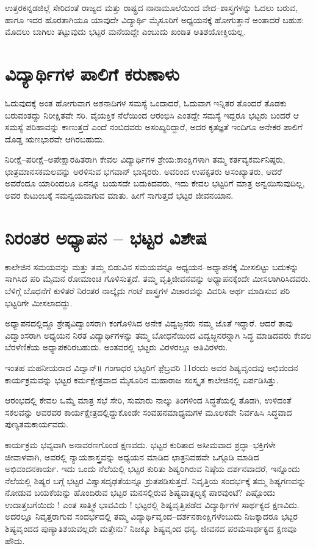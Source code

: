 ಉತ್ತರಕನ್ನಡಜಿಲ್ಲೆ ಸೇರಿದಂತೆ ರಾಜ್ಯದ ಮತ್ತು ರಾಷ್ಟ್ರದ ನಾನಾಮೂಲೆಯಿಂದ ವೇದ–ಶಾಸ್ತ್ರಗಳನ್ನು ಓದಲು ಬರುವ, ಹಾಗೂ ಇದರ ಹೊರತಾಗಿಯೂ ಯಾವುದೇ ವಿದ್ಯಾರ್ಥಿ ಮೈಸೂರಿಗೆ ಅಧ್ಯಯನಕ್ಕೆ ಹೋಗುತ್ತಾನೆ ಅಂತಾದರೆ ಬಹುಶ: ಮೊದಲು ಬಾಗಿಲು ತಟ್ಟುವುದು  ಭಟ್ಟರ ಮನೆಯದ್ದೇ ಎಂಬುದು ಖಂಡಿತ ಅತಿಶಯೋಕ್ತಿಯಲ್ಲ. 

\section*{ವಿದ್ಯಾರ್ಥಿಗಳ ಪಾಲಿಗೆ ಕರುಣಾಳು}

ಓದುವುದಕ್ಕೆ ಅಂತ ಹೋಗುವಾಗ ಅಶನಾದಿಗಳ ಸಮಸ್ಯೆ ಒಂದಾದರೆ, ಓದುವಾಗ ಇನ್ನಿತರ ತೊಂದರೆ ತೊಡಕು ಬರುವಂತದ್ದು ನಿರೀಕ್ಷಿತವೇ ಸರಿ. ವೈಯಕ್ತಿಕ ನೆಲೆಯಿಂದ ಆರಂಭಿಸಿ ಎಂತದ್ದೇ ಸಮಸ್ಯೆ ಇದ್ದರೂ ಭಟ್ಟರು ಬಂದರೆ ಆ ಸಮಸ್ಯೆ ಪರಿಹಾವನ್ನು ಕಾಣುತ್ತದೆ ಎಂದೆ ನಂಬಿದವರು ಅಸಂಖ್ಯರಿದ್ದಾರೆ, ಅದರ ಕೃತಜ್ಞತೆ ಇಂದಿಗೂ ಅನೇಕರ ಪಾಲಿಗೆ ದೊಡ್ಡ ಋಣಭಾರವೇ ಆಗಿರಬಹುದು. 

ನಿರೀಕ್ಷೆ–ಪರೀಕ್ಷೆ–ಅಪೇಕ್ಷಾರಹಿತರಾಗಿ ಕೇವಲ ವಿದ್ಯಾರ್ಥಿಗಳ ಶ್ರೇಯ:ಕಾಂಕ್ಷಿಗಳಾಗಿ ತಮ್ಮ ಕರ್ತವ್ಯಕರ್ಮನಿಷ್ಠರು, ಛಾತ್ರಮಾನಸಕಮಲವನ್ನು ಅರಳಿಸುವ ಭಗವಾನ್ ಭಾಸ್ಕರರು. ಅವರಿಂದ ಉಪಕೃತರು ಅಸಂಖ್ಯಾತರು, ಆದರೆ ಅವರೆಂದೂ ಯಾರಿಂದಲೂ ಏನನ್ನೂ ಬಯಸದೇ ಬದುಕಿದವರು, ಇದು ಕೇವಲ ಭಟ್ಟರಿಗೆ ಮಾತ್ರ ಅನ್ವಯಿಸುವುದಿಲ್ಲ, ಅವರ ಕುಟುಂಬಕ್ಕೆ ಸಮನ್ವಯವಾಗುವ ಮಾತು. ಹೀಗೆ ಸಾಗುತ್ತದೆ  ಭಟ್ಟರ ಜೀವನಯಾನ.

\section*{ನಿರಂತರ ಅಧ್ಯಾಪನ – ಭಟ್ಟರ ವಿಶೇಷ}

ಕಾಲೇಜಿನ ಸಮಯವನ್ನು ಮತ್ತು ತಮ್ಮ ಬಿಡುವಿನ ಸಮಯವನ್ನೂ ಅಧ್ಯಯನ–ಅಧ್ಯಾಪನಕ್ಕೆ ಮೀಸಲಿಟ್ಟು ಬದುಕನ್ನು ಸಾಗಿಸಿದ ಪರಿ ಮೈಮನ ರೋಮಾಂಚ ಗೊಳಿಸುತ್ತದೆ. ತಮ್ಮ ವೃತ್ತಿಜೀವನವನ್ನು ಅಧ್ಯಾಪನಕ್ಕೆಂದೇ ಮೀಸಲಾಗಿರಿಸಿದವರು. ಬೆಳಿಗ್ಗೆ ಬೊಧನೆಗೆ ಕುಳಿತರೆ ನಿರಂತರ ನಾಲ್ಕೈದು ಗಂಟೆ ಶಾಸ್ತ್ರಗಳ ವಿಚಾರವನ್ನು ವಿವರಿಸಿ ಅರ್ಥ ಮಾಡಿಸುವ ಪರಿ ಭಟ್ಟರಿಗೇ ಮೀಸಲಾದದ್ದು.

ಅಧ್ಯಾಪನದಲ್ಲಿದ್ದೂ ಶ್ರೇಷ್ಠವಿದ್ವಾಂಸರಾಗಿ  ಕಂಗೊಳಿಸಿದ ಅನೇಕ ವಿದ್ವಜ್ಜನರು ನಮ್ಮ ಜೊತೆ ಇದ್ದಾರೆ. ಆದರೆ ತಾವು ವಿದ್ವಾಂಸರಾಗಿ ಅಧ್ಯಯನ ನಿರತ ವಿದ್ಯಾರ್ಥಿಗಳನ್ನು ತಮ್ಮ ಬೋಧನೆಯಿಂದ ವಿದ್ವಜ್ಜನರನ್ನಾಗಿ ಸಿದ್ಧ ಮಾಡಿದವರು ಕೇವಲ ಬೆರಳೆಣಿಕೆಯ ಅಧ್ಯಾಪಕರಿರಬಹುದು. ಅಂತವರಲ್ಲಿ ಭಟ್ಟರು ವಿರಳರಲ್ಲೂ ಅತಿವಿರಳರು.

ಇಂತಹ ಮಹನೀಯರಾದ ವಿದ್ವಾನ್॥ ಗಂಗಾಧರ ಭಟ್ಟರಿಗೆ ಫ಼ೆಬ್ರವರಿ 11ರಂದು ಅವರ ಶಿಷ್ಯವೃಂದವು  ಅಭಿವಂದನ ಕಾರ್ಯಕ್ರಮವನ್ನು ಭಟ್ಟರ ಕರ್ಮಕ್ಷೇತ್ರವಾದ ಮೈಸೂರಿನ ಮಹಾರಾಜ ಸಂಸ್ಕೃತ ಕಾಲೇಜಿನಲ್ಲಿ ಏರ್ಪಡಿಸಿತ್ತು. 

ಆರಂಭದಲ್ಲಿ ಕೇವಲ ಒಮ್ಮೆ ಮಾತ್ರ ಸಭೆ ಸೇರಿ, ಸುಮಾರು ನಾಲ್ಕು ತಿಂಗಳಿಂದ ಸಿದ್ಧತೆಯಲ್ಲಿ ತೊಡಗಿ, ಉಳಿದಂತೆ ಸಕಲವನ್ನು ಅವರವರ ಕಾರ್ಯಕ್ಷೇತ್ರದಲ್ಲಿದ್ದುಕೊಂಡೇ ಸಂವಹನಮಾಧ್ಯಮಗಳ ಮೂಲಕವೇ ನಿರ್ವಹಿಸಿ ಸಿದ್ಧವಾದ ಪುಣ್ಯತಮಕಾರ್ಯವದು. 

ಕಾರ್ಯಕ್ರಮ ಭವ್ಯವಾಗಿ ಅನಾವರಣಗೊಂಡ ಕ್ಷಣವದು. ಭಟ್ಟರ ಕುರಿತಾದ ಅಸೀಮವಾದ ಶ್ರದ್ಧಾ–ಭಕ್ತಿಗಳೇ ಜೀವಾಳವಾಗಿ, ಅವರಲ್ಲಿ ನ್ಯಾಯಶಾಸ್ತ್ರವನ್ನು ಅಧ್ಯಯನ ಮಾಡಿದ ಛಾತ್ರನಿವಹವೇ ಒಗ್ಗೂಡಿ ಮಾಡಿದ ಅಭಿವಂದನಕಾರ್ಯ.    ಇದು ಒಂದು ನೆಲೆಯಲ್ಲಿ ಭಟ್ಟರ ಕುರಿತು ಶಿಷ್ಯರಿಗಿರುವ ನಿಷ್ಠೆಯ ದರ್ಶನವಾದರೆ, ಇನ್ನೊಂದು ನೆಲೆಯಲ್ಲಿ  ಶಿಷ್ಯರ ಬಗ್ಗೆ ಭಟ್ಟರ ವಿಶ್ವಾಸದೃಢತೆಯನ್ನೂ ಶ್ರುತಪಡಿಸುತ್ತದೆ. ನಿವೃತ್ತಿಯ ಸಂದರ್ಭಕ್ಕೆ  ತಮ್ಮ ಶಿಷ್ಯಗಣವನ್ನು ನೋಡುವ ಬಯಕೆಯನ್ನು ಹೊಂದಿರುವ ಭಟ್ಟರ ಮನಸಲ್ಲಿರುವ ಶಿಷ್ಯವಾತ್ಸಲ್ಯಕ್ಕೆ ಪಾರವುಂಟೆ? ಎಷ್ಟೊಂದು ಉದಾತ್ತಬಗೆಯಿದು ! ಎಂತ ಸಾತ್ತ್ವಿಕ ಭಾವವಿದು ! ಭಟ್ಟರಲ್ಲಿ ಶಿಷ್ಯವೃತ್ತಿಪಡೆದ ವಿದ್ಯಾರ್ಥಿಗಳ ಸಾರ್ಥಕ್ಯದ ಕ್ಷಣವಿದು. ಅದರಲ್ಲೂ ನಿವೃತ್ತರಾಗುವ ಸಂದರ್ಭದಲ್ಲಿ ತಮ್ಮ ವಿದ್ಯಾರ್ಥಿವೃಂದ–ದರ್ಶನಕಾಂಕ್ಷಿಗಳೆಂಬುದು ನಿಜಕ್ಕಾದರೂ ಭಟ್ಟರ ಶಿಷ್ಯವೃಂದದ ಪುಣ್ಯಾತಿಶಯವಲ್ಲದೇ ಮತ್ತೇನು? ನಿಜಕ್ಕೂ ಶಿಷ್ಯವೃಂದ ಧನ್ಯ. ಜೀವನದ ಪರಮಸಾರ್ಥಕ್ಯದ ಕ್ಷಣವೂ ಹೌದು. 

